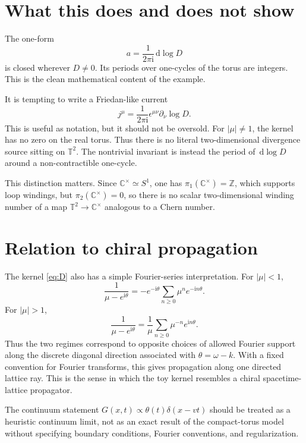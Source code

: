 \documentclass[11pt]{article}
\newcommand{\dd}{\,\mathrm{d}}
\newcommand{\ii}{\mathrm{i}}
\newcommand{\TT}{\mathbb{T}}
\newcommand{\CC}{\mathbb{C}}
\begin{document}
\section{What this does and does not show}

The one-form
\begin{equation}
  a=\frac{1}{2\pi\ii}\dd\log D
\end{equation}
is closed wherever \(D\neq0\).  Its periods over one-cycles of the torus are integers.  This is the clean mathematical content of the example.

It is tempting to write a Friedan-like current
\begin{equation}
  j^\mu=\frac{1}{2\pi\ii}\epsilon^{\mu\nu}\partial_\nu\log D.
\end{equation}
This is useful as notation, but it should not be oversold.  For \(|\mu|\neq1\), the kernel has no zero on the real torus.  Thus there is no literal two-dimensional divergence source sitting on \(\TT^2\).  The nontrivial invariant is instead the period of \(\dd\log D\) around a non-contractible one-cycle.

This distinction matters.  Since \(\CC^\times\simeq S^1\), one has \(\pi_1(\CC^\times)=\mathbb Z\), which supports loop windings, but \(\pi_2(\CC^\times)=0\), so there is no scalar two-dimensional winding number of a map \(\TT^2\to\CC^\times\) analogous to a Chern number.

\section{Relation to chiral propagation}

The kernel \eqref{eq:D} also has a simple Fourier-series interpretation.  For \(|\mu|<1\),
\begin{equation}
  \frac{1}{\mu-e^{\ii\theta}}
  =-e^{-\ii\theta}\sum_{n\ge0}\mu^n e^{-\ii n\theta}.
\end{equation}
For \(|\mu|>1\),
\begin{equation}
  \frac{1}{\mu-e^{\ii\theta}}
  =\frac{1}{\mu}\sum_{n\ge0}\mu^{-n}e^{\ii n\theta}.
\end{equation}
Thus the two regimes correspond to opposite choices of allowed Fourier support along the discrete diagonal direction associated with \(\theta=\omega-k\).  With a fixed convention for Fourier transforms, this gives propagation along one directed lattice ray.  This is the sense in which the toy kernel resembles a chiral spacetime-lattice propagator.

The continuum statement \(G(x,t)\propto\theta(t)\delta(x-vt)\) should be treated as a heuristic continuum limit, not as an exact result of the compact-torus model without specifying boundary conditions, Fourier conventions, and regularization.
\end{document}
